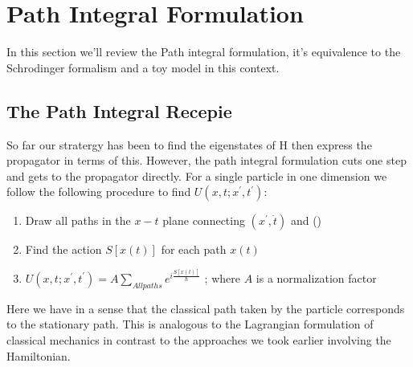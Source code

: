 \chapter{Path Integral Formulation}
In this section we'll review the Path integral formulation, it's equivalence to the Schrodinger formalism and a toy model in this context.
\section{The Path Integral Recepie}
So far our stratergy has been to find the eigenstates of H then express the propagator in terms of this. However, the path integral formulation cuts one step and gets to the propagator directly. For a single particle in one dimension we follow the following procedure to find $U(x,t;x^{'}, t^{'})$:
\begin{enumerate}
	\item Draw all paths in the $x-t$ plane connecting $(x^{'}, \dot{t})$ and ()
	\item Find the action $S[x(t)]$ for each path $x(t)$
	\item $U(x,t;x^{'}, t^{'}) = A \sum_{All paths} e^{i\frac{S[x(t)]}{\hbar} }$  ; where $A$ is a normalization factor
\end{enumerate}
Here we have in a sense that the classical path taken by the particle corresponds to the stationary path. This is analogous to the Lagrangian formulation of classical mechanics in contrast to the approaches we took earlier involving the Hamiltonian.
